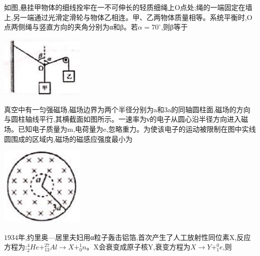 \question[6]如图,悬挂甲物体的细线拴牢在一不可伸长的轻质细绳上O点处;绳的一端固定在墙上,另一端通过光滑定滑轮与物体乙相连。甲、乙两物体质量相等。系统平衡时,O点两侧绳与竖直方向的夹角分别为α和β。若$α=70^∘$,则β等于\begin{center}\includegraphics[width=4cm]{img/image3.png}\end{center}
\begin{solution}{4cm}

\end{solution}



\question[6]真空中有一匀强磁场,磁场边界为两个半径分别为a和3a的同轴圆柱面,磁场的方向与圆柱轴线平行,其横截面如图所示。一速率为ν的电子从圆心沿半径方向进入磁场。已知电子质量为m,电荷量为e,忽略重力。为使该电子的运动被限制在图中实线圆围成的区域内,磁场的磁感应强度最小为\begin{center}\includegraphics[width=4cm]{img/image4.png}\end{center}
\begin{solution}{4cm}

\end{solution}



\question[6]$1934$年,约里奥—居里夫妇用α粒子轰击铝箔,首次产生了人工放射性同位素X,反应方程为:$_{2}^{4}He+_{13}^{27}Al\rightarrow X+_0^1n$。X会衰变成原子核Y,衰变方程为$X→Y+_1^0e$,则
\begin{solution}{4cm}

\end{solution}


